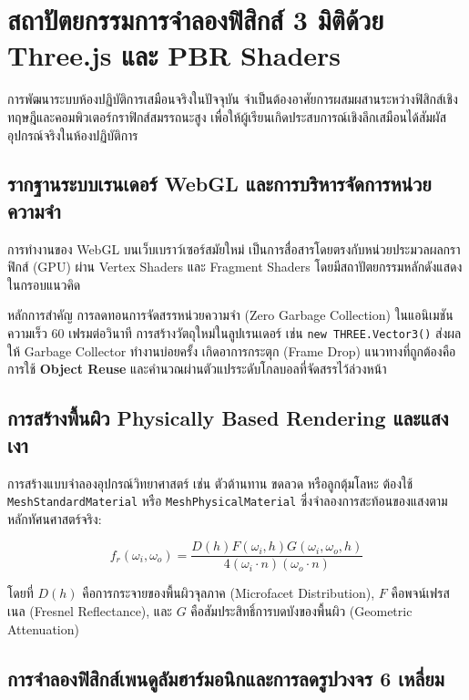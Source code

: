 \chapter{สถาปัตยกรรมการจำลองฟิสิกส์ 3 มิติด้วย Three.js และ PBR Shaders}

การพัฒนาระบบห้องปฏิบัติการเสมือนจริงในปัจจุบัน จำเป็นต้องอาศัยการผสมผสานระหว่างฟิสิกส์เชิงทฤษฎีและคอมพิวเตอร์กราฟิกส์สมรรถนะสูง เพื่อให้ผู้เรียนเกิดประสบการณ์เชิงลึกเสมือนได้สัมผัสอุปกรณ์จริงในห้องปฏิบัติการ

\section{รากฐานระบบเรนเดอร์ WebGL และการบริหารจัดการหน่วยความจำ}

การทำงานของ WebGL บนเว็บเบราว์เซอร์สมัยใหม่ เป็นการสื่อสารโดยตรงกับหน่วยประมวลผลกราฟิกส์ (GPU) ผ่าน Vertex Shaders และ Fragment Shaders โดยมีสถาปัตยกรรมหลักดังแสดงในกรอบแนวคิด

\begin{theoremlab}{หลักการสำคัญ การลดทอนการจัดสรรหน่วยความจำ (Zero Garbage Collection)}
ในแอนิเมชันความเร็ว 60 เฟรมต่อวินาที การสร้างวัตถุใหม่ในลูปเรนเดอร์ เช่น \texttt{new THREE.Vector3()} ส่งผลให้ Garbage Collector ทำงานบ่อยครั้ง เกิดอาการกระตุก (Frame Drop) แนวทางที่ถูกต้องคือการใช้ \textbf{Object Reuse} และคำนวณผ่านตัวแปรระดับโกลบอลที่จัดสรรไว้ล่วงหน้า
\end{theoremlab}

\section{การสร้างพื้นผิว Physically Based Rendering และแสงเงา}

การสร้างแบบจำลองอุปกรณ์วิทยาศาสตร์ เช่น ตัวต้านทาน ขดลวด หรือลูกตุ้มโลหะ ต้องใช้ \texttt{MeshStandardMaterial} หรือ \texttt{MeshPhysicalMaterial} ซึ่งจำลองการสะท้อนของแสงตามหลักทัศนศาสตร์จริง:

\begin{equation}
f_r(\omega_i, \omega_o) = \frac{D(h) F(\omega_i, h) G(\omega_i, \omega_o, h)}{4 (\omega_i \cdot n)(\omega_o \cdot n)}
\end{equation}

โดยที่ $D(h)$ คือการกระจายของพื้นผิวจุลภาค (Microfacet Distribution), $F$ คือพจน์เฟรสเนล (Fresnel Reflectance), และ $G$ คือสัมประสิทธิ์การบดบังของพื้นผิว (Geometric Attenuation)

\section{การจำลองฟิสิกส์เพนดูลัมฮาร์มอนิกและการลดรูปวงจร 6 เหลี่ยม}

